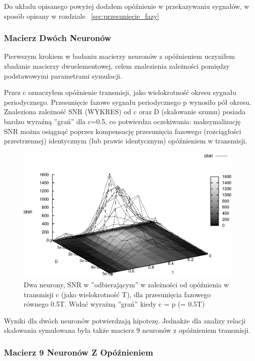   Do układu opisanego powyżej dodałem opóźnienie w przekazywaniu sygnałów, w sposób opisany w rozdziale ~\ref{sec:przesuniecie_fazy}

  
  \subsubsection{Macierz Dwóch Neuronów}

  Pierwszym krokiem w badaniu macierzy neuronów z opóźnieniem uczyniłem zbadanie macierzy dwuelementowej, celem znalezienia zależności pomiędzy podstawowymi parametrami symulacji.

  Przez c oznaczyłem opóźnienie transmisji, jako wielokrotność okresu sygnału periodycznego. Przesunięcie fazowe sygnału periodycznego p wynosiło pół okresu.
  Znaleziona zależność SNR (WYKRES) od c oraz D (skalowanie szumu) posiada bardzo wyraźną ''grań'' dla c=0.5, co potwierdza oczekiwania: maksymalizację SNR można osiągnąć poprzez kompensację przesunięcia fazowego (rozciągłości przestrzennej) identycznym (lub prawie identycznym) opóźnieniem w transmisji.

  \begin{figure}
    \includegraphics[width=140mm]{images/2neuron/3d}
    \caption{Dwa neurony, SNR w ''odbierającym'' w zależności od opóźnienia w transmisji c (jako wielokrotność T), dla przesunięcia fazowego równego 0.5T. Widać wyraźną ''grań'' kiedy c = p (= 0.5T)}
    \label{fig:graphics:snr_c_d_3d}
  \end{figure}

  Wyniki dla dwóch neuronów potwierdzają hipotezę. Jednakże dla analizy relacji skalowania symulowana była także macierz 9 neuronów z opóźnieniem transmisji.

  \subsubsection{Macierz 9 Neuronów Z Opóźnieniem}

